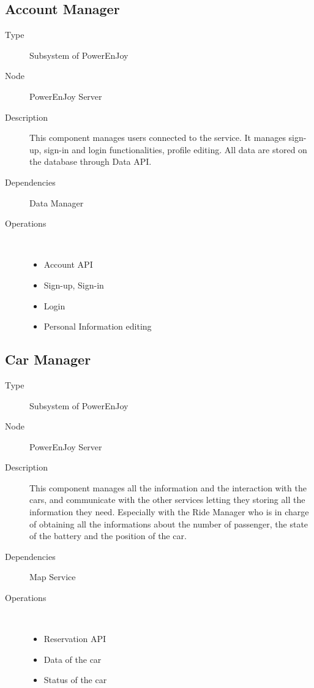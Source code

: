 \subsection{Account Manager}
\begin{description}
	\item[Type] Subsystem of PowerEnJoy
	\item[Node] PowerEnJoy Server
	\item[Description] This component manages users connected to the service. It manages sign-up, sign-in and login functionalities, profile editing. All data are stored on the database through Data API.
	\item[Dependencies] Data Manager
	\item[Operations] \ \\
		\begin{itemize}
			\item Account API
			\item Sign-up, Sign-in
			\item Login  
			\item Personal Information editing 
	\end{itemize}
\end{description}

\subsection{Car Manager}
\begin{description}
	\item[Type] Subsystem of PowerEnJoy
	\item[Node] PowerEnJoy Server
	\item[Description] This component manages all the information and the interaction with the cars, and communicate with the other services letting they storing all the information they need. Especially  with the Ride Manager who is in charge of obtaining all the informations about the number of passenger, the state of the battery and the position of the car.
	\item[Dependencies] Map Service
	\item[Operations] \ \\
		\begin{itemize}
			\item Reservation API
			\item Data of the car
			\item Status of the car   
	\end{itemize}
\end{description}

